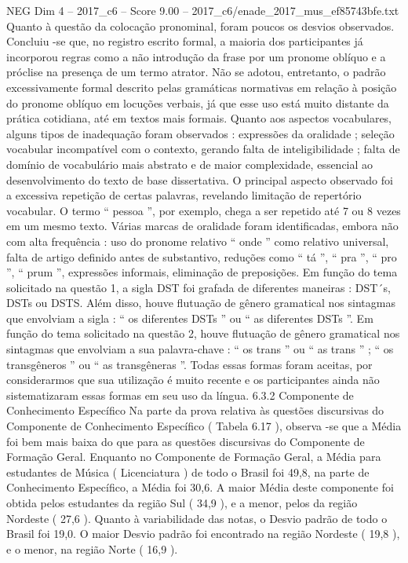 \begin{textsample}{NEG Dim 4 – 2017\_c6 – Score 9.00 – 2017\_c6/enade\_2017\_mus\_ef85743bfe.txt}
Quanto à questão da colocação pronominal, foram poucos os desvios observados.
Concluiu -se que, no registro escrito formal, a maioria dos participantes já incorporou regras como a não introdução da frase por um pronome oblíquo e a próclise na presença de um termo atrator.
Não se adotou, entretanto, o padrão excessivamente formal descrito pelas gramáticas normativas em relação à posição do pronome oblíquo em locuções verbais, já que esse uso está muito distante da prática cotidiana, até em textos mais formais.
Quanto aos aspectos vocabulares, alguns tipos de inadequação foram observados : expressões da oralidade ; seleção vocabular incompatível com o contexto, gerando falta de inteligibilidade ; falta de domínio de vocabulário mais abstrato e de maior complexidade, essencial ao desenvolvimento do texto de base dissertativa.
O principal aspecto observado foi a excessiva repetição de certas palavras, revelando limitação de repertório vocabular.
O termo “ pessoa ”, por exemplo, chega a ser repetido até 7 ou 8 vezes em um mesmo texto.
Várias marcas de oralidade foram identificadas, embora não com alta frequência : uso do pronome relativo “ onde ” como relativo universal, falta de artigo definido antes de substantivo, reduções como “ tá ”, “ pra ”, “ pro ”, “ prum ”, expressões informais, eliminação de preposições.
Em função do tema solicitado na questão 1, a sigla DST foi grafada de diferentes maneiras : DST´s, DSTs ou DSTS.
Além disso, houve flutuação de gênero gramatical nos sintagmas que envolviam a sigla : “ os diferentes DSTs ” ou “ as diferentes DSTs ”.
Em função do tema solicitado na questão 2, houve flutuação de gênero gramatical nos sintagmas que envolviam a sua palavra-chave : “ os trans ” ou “ as trans ” ; “ os transgêneros ” ou “ as transgêneras ”.
Todas essas formas foram aceitas, por considerarmos que sua utilização é muito recente e os participantes ainda não sistematizaram essas formas em seu uso da língua. 6.3.2 Componente de Conhecimento Específico Na parte da prova relativa às questões discursivas do Componente de Conhecimento Específico ( Tabela 6.17 ), observa -se que a Média foi bem mais baixa do que para as questões discursivas do Componente de Formação Geral.
Enquanto no Componente de Formação Geral, a Média para estudantes de Música ( Licenciatura ) de todo o Brasil foi 49,8, na parte de Conhecimento Específico, a Média foi 30,6.
A maior Média deste componente foi obtida pelos estudantes da região Sul ( 34,9 ), e a menor, pelos da região Nordeste ( 27,6 ).
Quanto à variabilidade das notas, o Desvio padrão de todo o Brasil foi 19,0.
O maior Desvio padrão foi encontrado na região Nordeste ( 19,8 ), e o menor, na região Norte ( 16,9 ).

\end{textsample}
